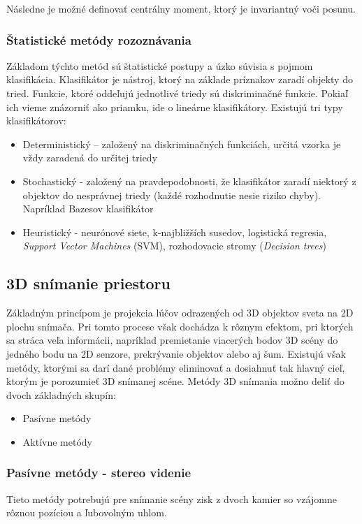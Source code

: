 Následne je možné definovať centrálny moment, ktorý je invariantný voči posunu. 


\subsubsection{Štatistické metódy rozoznávania}
Základom týchto metód sú štatistické postupy a úzko súvisia s pojmom klasifikácia. Klasifikátor je nástroj, ktorý na základe príznakov zaradí objekty do tried. Funkcie, ktoré oddeľujú jednotlivé triedy sú diskriminačné funkcie. Pokiaľ ich vieme znázorniť ako priamku, ide o lineárne klasifikátory. Existujú tri typy klasifikátorov: \cite{pocitacove_videnie_v_praxi}

\begin{itemize}
    \item Deterministický  – založený na diskriminačných funkciách, určitá vzorka je vždy zaradená do určitej triedy 
    \item Stochastický -  založený na pravdepodobnosti, že klasifikátor zaradí niektorý z objektov do nesprávnej triedy (každé rozhodnutie nesie riziko chyby). Napríklad Bazesov klasifikátor
    \item Heuristický - neurónové siete, k-najbližších susedov, logistická regresia, \textit{Support Vector Machines} (SVM), rozhodovacie stromy (\textit{Decision trees}) 
\end{itemize}

\subsection{3D snímanie priestoru}
Základným princípom je projekcia lúčov odrazených od 3D objektov sveta na 2D plochu snímača. Pri tomto procese však dochádza k rôznym efektom, pri ktorých sa stráca veľa informácii, napríklad premietanie viacerých bodov 3D scény do jedného bodu na 2D senzore, prekrývanie objektov alebo aj šum. Existujú však metódy, ktorými sa darí dané problémy eliminovať a dosiahnuť tak  hlavný cieľ, ktorým je porozumieť 3D snímanej scéne. Metódy 3D snímania možno deliť do dvoch základných skupín: \cite{Analysis_and_Machine_Vision}

\begin{itemize}
    \item Pasívne metódy
    \item Aktívne metódy 
\end{itemize}

\subsubsection{Pasívne metódy - stereo videnie}
Tieto metódy potrebujú pre snímanie scény zisk z dvoch kamier so vzájomne rôznou pozíciou a ľubovolným uhlom. 

